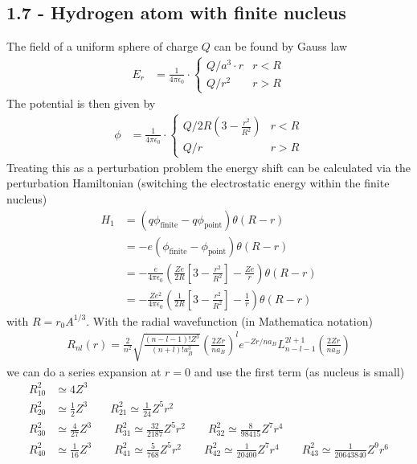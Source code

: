 \documentclass[10pt,a4paper]{book}
\theoremstyle{definition}
\begin{document}
\subsection{1.7 - Hydrogen atom with finite nucleus}
The field of a uniform sphere of charge $Q$ can be found by Gauss law
\begin{align}
E_r&=\frac{1}{4\pi\epsilon_0}\cdot\left\{
\begin{array}{ll}
Q/a^3\cdot r & r<R\\
Q/r^2 & r>R
\end{array}
\right.
\end{align}
The potential is then given by
\begin{align}
\phi&=\frac{1}{4\pi\epsilon_0}\cdot\left\{
\begin{array}{ll}
Q/2R\left(3-\frac{r^2}{R^2}\right) & r<R\\
Q/r & r>R
\end{array}
\right.
\end{align}
Treating this as a perturbation problem the energy shift can be calculated via the perturbation Hamiltonian (switching the electrostatic energy within the finite nucleus)
\begin{align}
H_1
&=(q\phi_\text{finite}-q\phi_\text{point})\theta(R-r)\\
&=-e\left(\phi_\text{finite}-\phi_\text{point}\right)\theta(R-r)\\
&=-\frac{e}{4\pi\epsilon_0}\left(\frac{Ze}{2R}
\left[3-\frac{r^2}{R^2}\right]-\frac{Ze}{r}\right)\theta(R-r)\\
&=-\frac{Ze^2}{4\pi\epsilon_0}\left(\frac{1}{2R}
\left[3-\frac{r^2}{R^2}\right]-\frac{1}{r}\right)\theta(R-r)
\end{align}
with $R=r_0A^{1/3}$. With the radial wavefunction (in Mathematica notation)
\begin{align}
R_{nl}(r)=\frac{2}{n^2}\sqrt{\frac{(n-l-1)!Z^3}{(n+l)!a_B^3}}\left(\frac{2Zr}{na_B}\right)^le^{-Zr/na_B}L_{n-l-1}^{2l+1}(\frac{2Zr}{na_B})
\end{align}
we can do a series expansion at $r=0$ and use the first term (as nucleus is small)
\begin{align}
R_{10}^2&\simeq 4Z^3\\
R_{20}^2&\simeq \frac{1}{2}Z^3\qquad R_{21}^2\simeq \frac{1}{24}Z^5r^2\\
R_{30}^2&\simeq \frac{4}{27}Z^3\qquad R_{31}^2\simeq \frac{32}{2187}Z^5r^2\qquad R_{32}^2\simeq \frac{8}{98415}Z^7r^4\\
R_{40}^2&\simeq \frac{1}{16}Z^3\qquad R_{41}^2\simeq \frac{5}{768}Z^5r^2\qquad R_{42}^2\simeq \frac{1}{20400}Z^7r^4\qquad R_{43}^2\simeq \frac{1}{20643840}Z^9r^6
\end{align}
\end{document}
